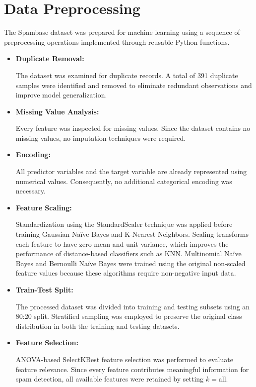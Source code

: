 \documentclass[12pt,a4paper]{article}
\begin{document}
	\section{Data Preprocessing}
	
	The Spambase dataset was prepared for machine learning using a sequence of preprocessing operations implemented through reusable Python functions.
	
	\begin{itemize}
		
		\item \textbf{Duplicate Removal:}
		
		The dataset was examined for duplicate records. A total of 391 duplicate samples were identified and removed to eliminate redundant observations and improve model generalization.
		
		\item \textbf{Missing Value Analysis:}
		
		Every feature was inspected for missing values. Since the dataset contains no missing values, no imputation techniques were required.
		
		\item \textbf{Encoding:}
		
		All predictor variables and the target variable are already represented using numerical values. Consequently, no additional categorical encoding was necessary.
		
		\item \textbf{Feature Scaling:}
		
		Standardization using the StandardScaler technique was applied before training Gaussian Na\"ive Bayes and K-Nearest Neighbors. Scaling transforms each feature to have zero mean and unit variance, which improves the performance of distance-based classifiers such as KNN. Multinomial Na\"ive Bayes and Bernoulli Na\"ive Bayes were trained using the original non-scaled feature values because these algorithms require non-negative input data.
		
		\item \textbf{Train-Test Split:}
		
		The processed dataset was divided into training and testing subsets using an 80:20 split. Stratified sampling was employed to preserve the original class distribution in both the training and testing datasets.
		
		\item \textbf{Feature Selection:}
		
		ANOVA-based SelectKBest feature selection was performed to evaluate feature relevance. Since every feature contributes meaningful information for spam detection, all available features were retained by setting $k=\text{all}$.
		
	\end{itemize}
	
\end{document}
